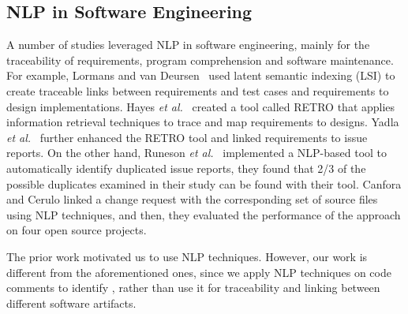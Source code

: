\subsection{NLP in Software Engineering}

A number of studies leveraged NLP in software engineering, mainly for the traceability of requirements, program comprehension and software maintenance. For example, Lormans and van Deursen~\cite{Lormans2006CSRM} used latent semantic indexing (LSI) to create traceable links between requirements and test cases and requirements to design implementations. Hayes \textit{et al.}~\cite{Hayes2005, Hayes2006TSE} created a tool called RETRO that applies information retrieval techniques to trace and map requirements to designs. Yadla \textit{et al.}~\cite{yadla2005tracing} further enhanced the RETRO tool and linked requirements to issue reports. On the other hand, Runeson \textit{et al.}~\cite{Runeson2007ICSE} implemented a NLP-based tool to automatically identify duplicated issue reports, they found that 2/3 of the possible duplicates examined in their study can be found with their tool. Canfora and Cerulo \cite{Canfora2005ISSM} linked a change request with the corresponding set of source files using NLP techniques, and then, they evaluated the performance of the approach on four open source projects.  

The prior work motivated us to use NLP techniques. However, our work is different from the aforementioned ones, since we apply NLP techniques on code comments to identify \SATD, rather than use it for traceability and linking between different software artifacts.